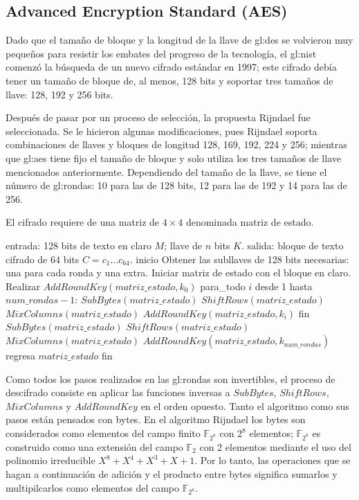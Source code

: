 \subsection{Advanced Encryption Standard (AES)}

Dado que el tamaño de bloque y la longitud de la llave de \acrshort{gl:des}
se volvieron muy pequeños para resistir los embates del progreso
de la tecnología, el \acrshort{gl:nist} comenzó la búsqueda de un nuevo cifrado
estándar en 1997; este cifrado debía tener un tamaño de bloque de,
al menos, 128 bits y soportar tres tamaños de llave: 128, 192 y 256 bits.

Después de pasar por un proceso de selección, la propuesta Rijndael fue
seleccionada. Se le hicieron algunas modificaciones, pues Rijndael soporta
combinaciones de llaves y bloques de longitud 128, 169, 192, 224 y 256;
mientras que \acrshort{gl:aes} tiene fijo el tamaño de bloque y solo utiliza
los tres tamaños de llave mencionados anteriormente. Dependiendo del tamaño 
de la llave, se tiene el número de \glspl{gl:ronda}: 10 para las de 128 bits,
12 para las de 192 y 14 para las de 256.

El cifrado requiere de una matriz de $4 \times 4$ denominada matriz de
estado.

\begin{pseudocodigo}[caption={AES, cifrado.}, label={aes:1}]
  entrada:    128 bits de texto en claro $M$; llave de $n$ bits $K$.
  salida:     bloque de texto cifrado de 64 bits $C = c_1 \dots c_{64}$.
  inicio
    Obtener las subllaves de 128 bits necesarias: una para cada ronda y una extra.
    Iniciar matriz de estado con el bloque en claro.
    Realizar $AddRoundKey(matriz\_estado, k_0)$
    para_todo $i$ desde 1 hasta $num\_rondas-1$:
      $SubBytes(matriz\_estado)$
      $ShiftRows(matriz\_estado)$
      $MixColumns(matriz\_estado)$
      $AddRoundKey(matriz\_estado, k_i)$
    fin
    $SubBytes(matriz\_estado)$
    $ShiftRows(matriz\_estado)$
    $MixColumns(matriz\_estado)$
    $AddRoundKey(matriz\_estado, k_{num\_rondas})$
    regresa $matriz\_estado$
  fin
\end{pseudocodigo}

Como todos los pasos realizados en las \glspl{gl:ronda} son invertibles, el
proceso de descifrado consiste en aplicar las funciones inversas a
$SubBytes$, $ShiftRows$, $MixColumns$ y $AddRoundKey$ en el orden
opuesto. Tanto el algoritmo como sus pasos están pensados con bytes. 
En el algoritmo Rijndael los bytes son considerados como elementos del
campo finito $\mathbb{F}_{2^8}$ con ${2^8}$ elementos; $\mathbb{F}_{2^8}$
es construido como una extensión del campo  $\mathbb{F}_{2}$ con 2 elementos
mediante el uso del polinomio irreducible $X^8+X^4+X^3+X+1$.
Por lo tanto, las operaciones que se hagan a continuación de adición y el
producto entre bytes significa sumarlos y multipilcarlos como elementos del 
campo  $\mathbb{F}_{2^8}$.

